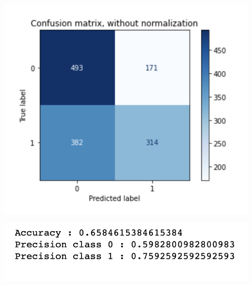 \documentclass[12pt]{article}
\begin{document}
\begin{multicols*}{2}
\begin{center}
		\includegraphics[scale=0.5]{../screenshot/Overlapping-Elastic-results/cf.png}

		\includegraphics[scale=0.5]{../screenshot/Overlapping-Elastic-results/hand_score.png}
  \end{center}

\end{multicols*}

		

	
\end{document}
